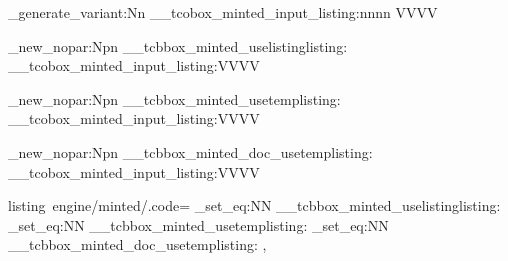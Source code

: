 \cs_generate_variant:Nn \__tcobox_minted_input_listing:nnnn {VVVV}


\cs_new_nopar:Npn \__tcbbox_minted_uselistinglisting:
  {
    \__tcobox_minted_input_listing:VVVV
      \kvtcb@minted@options
      \kvtcb@minted@language
      \kvtcb@listingfile
      \kvtcb@minted@style
  }


\cs_new_nopar:Npn \__tcbbox_minted_usetemplisting:
  {
    \__tcobox_minted_input_listing:VVVV
      \kvtcb@minted@options
      \kvtcb@minted@language
      \kvtcb@tempfile
      \kvtcb@minted@style
  }


\cs_new_nopar:Npn \__tcbbox_minted_doc_usetemplisting:
  {
    \__tcobox_minted_input_listing:VVVV
      \kvtcb@docmintoptions
      \kvtcb@docminted@language
      \kvtcb@tempfile
      \kvtcb@docmintstyle
  }


\tcbset
  {
    listing~engine/minted/.code=
      {
        \cs_set_eq:NN \tcbuselistinglisting   \__tcbbox_minted_uselistinglisting:
        \cs_set_eq:NN \tcbusetemplisting      \__tcbbox_minted_usetemplisting:
        \cs_set_eq:NN \tcb@doc@usetemplisting \__tcbbox_minted_doc_usetemplisting:
      },
  }

\ExplSyntaxOff





